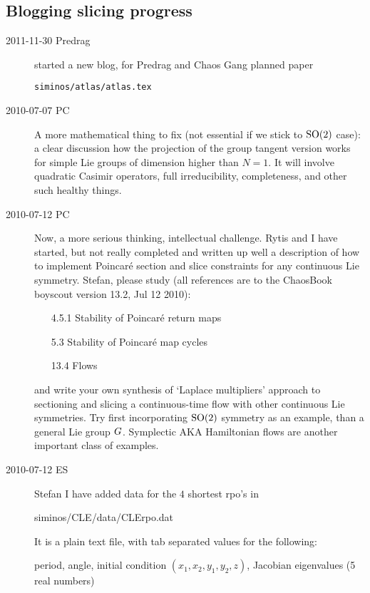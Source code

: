 \subsection{Blogging slicing progress}
\label{chap:atlasBlog}

\begin{description}
\item[2011-11-30 Predrag]
started a new blog, for Predrag and Chaos Gang planned paper

\texttt{siminos/atlas/atlas.tex}


\item[2010-07-07 PC]                                    \toCB
A more mathematical thing to fix (not essential if we stick to $\textrm{SO}(2)$
case): a clear discussion how the projection of the group tangent version
works for simple Lie groups of dimension higher than $N=1$. It will
involve quadratic Casimir operators, full irreducibility, completeness,
and other such healthy things.

\item[2010-07-12 PC] Now, a more serious thinking, intellectual
challenge. Rytis and I have started, but not really completed and written
up well a description of how to implement Poincar\'e section and slice
constraints for any continuous Lie symmetry. Stefan, please study (all
references are to the ChaosBook boyscout version 13.2, Jul 12 2010):
\begin{itemize}
  \item[4.5.1] Stability of Poincar\'e return maps
  \item[5.3] Stability of Poincar\'e map cycles
  \item[13.4] Flows
\end{itemize}
and write your own synthesis of `Laplace multipliers' approach to
sectioning and slicing a continuous-time flow with other continuous Lie
symmetries. Try first incorporating $\textrm{SO}(2)$ symmetry as an example, than
a general Lie group $G$. Symplectic AKA Hamiltonian flows are
another important class of examples.

\item[2010-07-12 ES]                                \toCB
Stefan I have added data for the $4$ shortest rpo's
in

siminos/CLE/data/CLErpo.dat

It is a plain text file, with tab separated values for the following:

period, angle, initial condition $(x_1,x_2,y_1,y_2,z)$,
Jacobian eigenvalues (5 real numbers)


\end{description}
